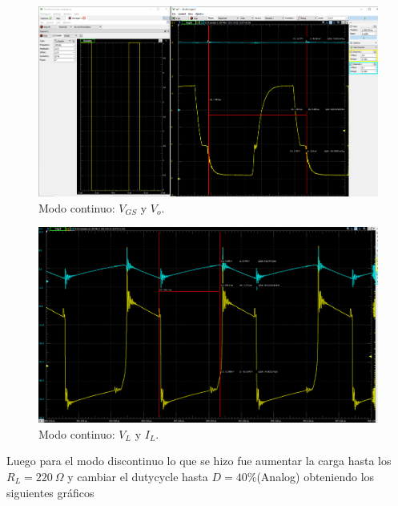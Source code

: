 \begin{figure}[H]
	\centering
	\includegraphics[width=\linewidth]{Imagenes/Continuo_VGS_VO}
	\caption{Modo continuo: $V_{GS}$ y $V_o$.}
	\label{fig:CONT_VGS_VO}
\end{figure}
\begin{figure}[H]
	\centering
	\includegraphics[width=\linewidth]{Imagenes/Continuo_VL_IL}
	\caption{Modo continuo: $V_L$ y $I_L$.}
	\label{fig:CONT_VL_IL}
\end{figure}




Luego para el modo discontinuo lo que se hizo fue aumentar la carga  hasta los $R_L=220 \ \Omega$ y cambiar el dutycycle hasta $D=40\%$(Analog)
obteniendo los siguientes gráficos

